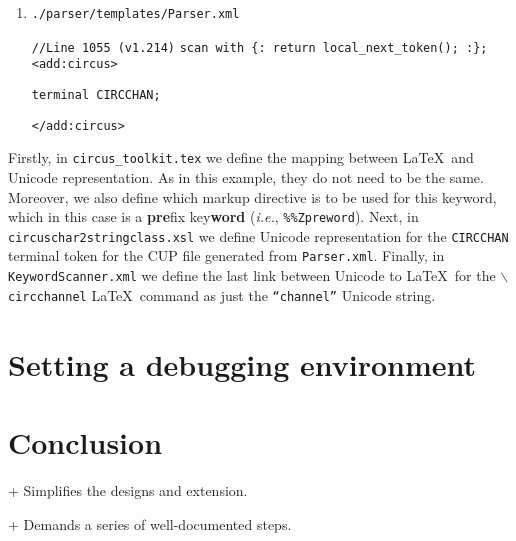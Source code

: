 \documentclass{article}
\begin{document}
\begin{enumerate}
        \hspace{15pt}\texttt{\}}

      \hspace{5pt}\texttt{\}}

    \item \texttt{./parser/templates/Parser.xml}

      \hspace{5pt}\texttt{//Line 1055 (v1.214)}
      \hspace{5pt}\texttt{scan with \{: return local\_next\_token(); :\};}
      \hspace{5pt}\texttt{<add:circus>}

        \hspace{10pt}\texttt{terminal CIRCCHAN;}

      \hspace{5pt}\texttt{</add:circus>}

\end{enumerate}

Firstly, in \texttt{circus\_toolkit.tex} we define the mapping between \LaTeX\
and Unicode representation. As in this example, they do not need to be the
same. Moreover, we also define which markup directive is to be used for this
keyword, which in this case is a \textbf{pre}fix key\textbf{word}
(\textit{i.e.}, \texttt{\%\%Zpreword}). Next, in
\texttt{circuschar2stringclass.xsl} we define Unicode representation for the
\texttt{CIRCCHAN} terminal token for the CUP file generated from
\texttt{Parser.xml}. Finally, in \texttt{KeywordScanner.xml} we define the last
link between Unicode to \LaTeX\ for the \texttt{$\backslash$circchannel}
\LaTeX\ command as just the \texttt{``channel''} Unicode string.


\section{Setting a debugging environment}\label{setting-debug-environment}



\section{Conclusion}\label{conclusion}

+ Simplifies the designs and extension.

+ Demands a series of well-documented steps.
\end{document}
